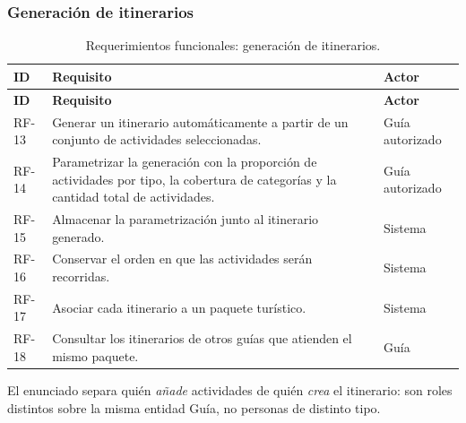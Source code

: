 \documentclass[11pt,a4paper]{article}
\begin{document}
\subsubsection{Generación de itinerarios}
{\footnotesize\setlength{\tabcolsep}{3pt}\renewcommand{\arraystretch}{1.15}
\begin{longtable}{|>{\raggedright\arraybackslash}p{1.28cm}|>{\raggedright\arraybackslash}p{11.28cm}|>{\raggedright\arraybackslash}p{2.98cm}|}
\caption{Requerimientos funcionales: generación de itinerarios.}\label{tab:rf-generacion}\\ \hline
\rowcolor{gray!20} \textbf{ID} & \textbf{Requisito} & \textbf{Actor} \\ \hline
\endfirsthead
\hline \rowcolor{gray!20} \textbf{ID} & \textbf{Requisito} & \textbf{Actor} \\ \hline
\endhead
RF-13 & Generar un itinerario automáticamente a partir de un conjunto de actividades seleccionadas. & Guía autorizado \\ \hline
RF-14 & Parametrizar la generación con la proporción de actividades por tipo, la cobertura de categorías y la cantidad total de actividades. & Guía autorizado \\ \hline
RF-15 & Almacenar la parametrización junto al itinerario generado. & Sistema \\ \hline
RF-16 & Conservar el orden en que las actividades serán recorridas. & Sistema \\ \hline
RF-17 & Asociar cada itinerario a un paquete turístico. & Sistema \\ \hline
RF-18 & Consultar los itinerarios de otros guías que atienden el mismo paquete. & Guía \\ \hline
\end{longtable}}
\vspace{2pt}
El enunciado separa quién \textit{añade} actividades de quién \textit{crea} el itinerario: son roles distintos sobre la misma entidad Guía, no personas de distinto tipo.
\end{document}
